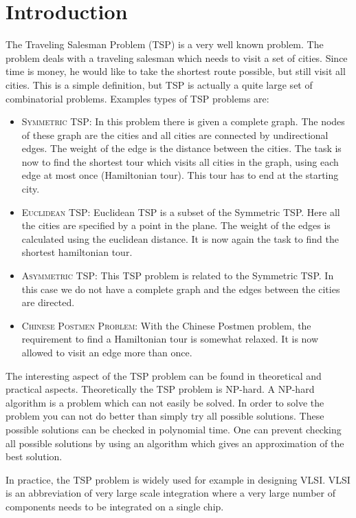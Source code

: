 \section{Introduction}
The Traveling Salesman Problem (TSP) is a very well known problem. The problem deals with a traveling salesman which needs to visit a set of cities. Since time is money, he would like to take the shortest route possible, but still visit all cities. This is a simple definition, but TSP is actually a quite large set of combinatorial problems. Examples types of  TSP problems are:

\begin{itemize}
\item \textsc{Symmetric TSP:}  In this problem there is given a complete graph. The nodes of these graph are the cities and all cities are connected by undirectional edges. The weight of the edge is the distance between the cities. The task is now to find the shortest tour which visits all cities in the graph, using each edge at most once (Hamiltonian tour). This tour has to end at the starting city.
\item \textsc{Euclidean TSP:}  Euclidean TSP is a subset of the Symmetric TSP. Here all the cities are specified by a point in the plane. The weight of the edges is calculated using the euclidean distance. It is now again the task to find the shortest hamiltonian tour.
\item \textsc{Asymmetric TSP:} This TSP problem is related to the Symmetric TSP. In this case we do not have a complete graph and the edges between the cities are directed.
\item \textsc{Chinese Postmen Problem:} With the Chinese Postmen problem,  the requirement to find a Hamiltonian tour is somewhat relaxed. It is now allowed to visit an edge more than once.
\end{itemize}

The interesting aspect of the TSP problem can be found in theoretical and practical aspects. Theoretically the TSP problem is NP-hard. A NP-hard algorithm is a problem which can not easily be solved. In order to solve the problem you can not do better than simply try all possible solutions. These possible solutions can be checked in polynomial time.  One can prevent checking all possible solutions by using an algorithm which gives an approximation of the best solution.

In practice, the TSP problem is widely used for example in designing  VLSI. VLSI is an abbreviation of very large scale integration where a very large number of components needs to be integrated on a single chip.

